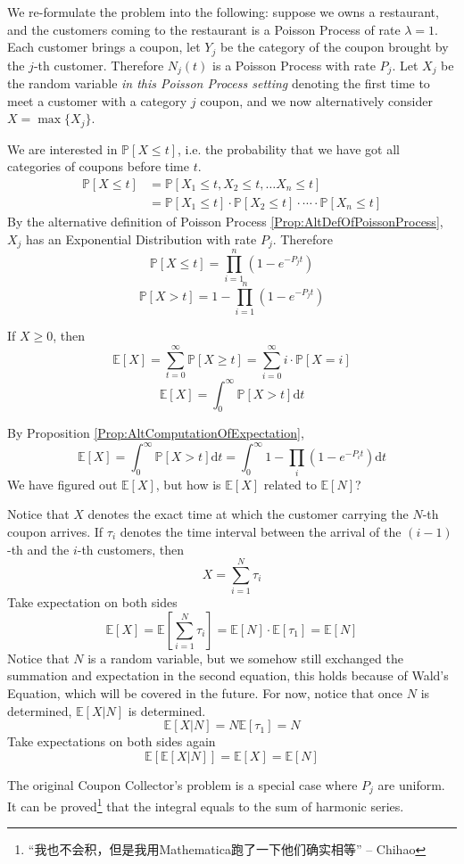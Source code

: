     We re-formulate the problem into the following: suppose we owns a restaurant, and the customers coming to the restaurant is a Poisson Process of rate $\lambda = 1$. Each customer brings a coupon, let $Y_j$ be the category of the coupon brought by the $j$-th customer. Therefore $N_j(t)$ is a Poisson Process with rate $P_j$. Let $X_j$ be the random variable \emph{in this Poisson Process setting} denoting the first time to meet a customer with a category $j$ coupon, and we now alternatively consider $X = \max \{X_j\}$.

    We are interested in $\mathbb{P}[X \le t]$, i.e. the probability that we have got all categories of coupons before time $t$.
    \begin{align*}
        \mathbb{P}[X \le t] &= \mathbb{P}[X_1 \le t, X_2 \le t, \dots X_n \le t]\\
        &= \mathbb{P}[X_1 \le t] \cdot \mathbb{P}[X_2 \le t] \cdot \cdots \cdot \mathbb{P}[X_n \le t]
    \end{align*}
    By the alternative definition of Poisson Process \ref{Prop:AltDefOfPoissonProcess}, $X_j$ has an Exponential Distribution with rate $P_j$. Therefore
    \[ \mathbb{P}[X \le t] = \prod_{i=1}^n (1-e^{-P_jt}) \]
    \[ \mathbb{P}[X > t] = 1 - \prod_{i=1}^n (1-e^{-P_jt}) \]
    \begin{proposition}\label{Prop:AltComputationOfExpectation}
        If $X \ge 0$, then
        \[ \mathbb{E}[X] = \sum_{t=0}^{\infty} \mathbb{P}[X \ge t] = \sum_{i=0}^{\infty}i\cdot\mathbb{P}[X=i] \]
        \[ \mathbb{E}[X] = \int_0^{\infty} \mathbb{P}[X > t]\mathrm{d}t\]
    \end{proposition}
    By Proposition \ref{Prop:AltComputationOfExpectation},
    \[ \mathbb{E}[X] = \int_0^{\infty} \mathbb{P}[X > t]\mathrm{d}t = \int_0^{\infty}1 - \prod_i (1-e^{-P_it})\mathrm{d}t \]
    We have figured out $\mathbb{E}[X]$, but how is $\mathbb{E}[X]$ related to $\mathbb{E}[N]$?

    Notice that $X$ denotes the exact time at which the customer carrying the $N$-th coupon arrives. If $\tau_i$ denotes the time interval between the arrival of the $(i-1)$-th and the $i$-th customers, then
    \[ X = \sum_{i=1}^N \tau_i \]
    Take expectation on both sides
    \[ \mathbb{E}[X] = \mathbb{E}\left[ \sum_{i=1}^N \tau_i \right] = \mathbb{E}[N]\cdot\mathbb{E}[\tau_1] = \mathbb{E}[N] \]
    Notice that $N$ is a random variable, but we somehow still exchanged the summation and expectation in the second equation, this holds because of Wald's Equation, which will be covered in the future. For now, notice that once $N$ is determined, $\mathbb{E}[X|N]$ is determined.
    \[ \mathbb{E}[X|N] = N\mathbb{E}[\tau_1] = N \]
    Take expectations on both sides again
    \[ \mathbb{E}[\mathbb{E}[X|N]] = \mathbb{E}[X] = \mathbb{E}[N] \]
    \begin{remark}
        The original Coupon Collector's problem is a special case where $P_j$ are uniform. It can be proved\footnote{“我也不会积，但是我用Mathematica跑了一下他们确实相等” -- Chihao} that the integral equals to the sum of harmonic series.
    \end{remark}


